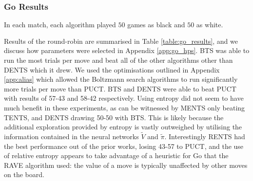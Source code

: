         \subsubsection{Go Results}

        
            In each match, each algorithm played $50$ games as black and $50$ as white.  

            Results of the round-robin are summarised in Table \ref{table:go_results}, and we discuss how parameters were selected in Appendix \ref{app:go_hps}. BTS was able to run the most trials per move and beat all of the other algorithms other than DENTS which it drew. We used the optimisations outlined in Appendix \ref{app:alias} which allowed the Boltzmann search algorithms to run significantly more trials per move than PUCT. 
            BTS and DENTS were able to beat PUCT with results of 57-43 and 58-42 respectively. Using entropy did not seem to have much benefit in these experiments, as can be witnessed by MENTS only beating TENTS, and DENTS drawing 50-50 with BTS. This is likely because the additional exploration provided by entropy is vastly outweighed by utilising the information contained in the neural networks $\tilde{V}$ and $\tilde{\pi}$. %
            Interestingly RENTS had the best performance out of the prior works, losing 43-57 to PUCT, and the use of relative entropy appears to take advantage of a heuristic for Go that the RAVE %
             algorithm used: the value of a move is typically unaffected by other moves on the board.
            
